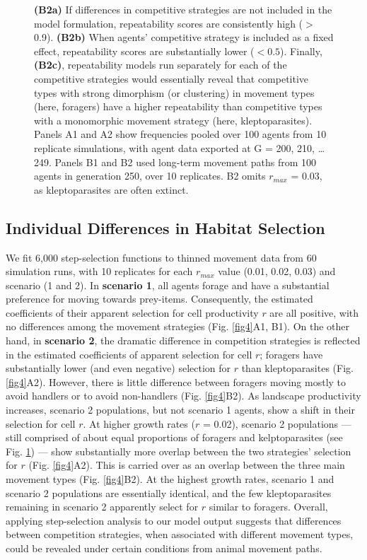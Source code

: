 \begin{figure}[h!]
{            \textbf{(B2a)} If differences in competitive strategies are not included in the model formulation, repeatability scores are consistently high ($>$ 0.9).
            \textbf{(B2b)} When agents' competitive strategy is included as a fixed effect, repeatability scores are substantially lower ($< 0.5$).
            Finally, \textbf{(B2c)}, repeatability models run separately for each of the competitive strategies would essentially reveal that competitive types with strong dimorphism (or clustering) in movement types (here, foragers) have a higher repeatability than competitive types with a monomorphic movement strategy (here, kleptoparasites).
            Panels A1 and A2 show frequencies pooled over 100 agents from 10 replicate simulations, with agent data exported at G = 200, 210, \ldots 249.
            Panels B1 and B2 used long-term movement paths from 100 agents in generation 250, over 10 replicates. B2 omits $r_{max}$ = 0.03, as kleptoparasites are often extinct.
        }
        \label{fig3}
    \end{figure}
    
    \subsection*{Individual Differences in Habitat Selection}
    
    We fit 6,000 step-selection functions to thinned movement data from 60 simulation runs, with 10 replicates for each $r_{max}$ value (0.01, 0.02, 0.03) and scenario (1 and 2).
    In \textbf{scenario 1}, all agents forage and have a substantial preference for moving towards prey-items.
    Consequently, the estimated coefficients of their apparent selection for cell productivity $r$ are all positive, with no differences among the movement strategies (Fig. \ref{fig4}A1, B1).
    On the other hand, in \textbf{scenario 2}, the dramatic difference in competition strategies is reflected in the estimated coefficients of apparent selection for cell $r$; foragers have substantially lower (and even negative) selection for $r$ than kleptoparasites (Fig. \ref{fig4}A2).
    However, there is little difference between foragers moving mostly to avoid handlers or to avoid non-handlers (Fig. \ref{fig4}B2).
    As landscape productivity increases, scenario 2 populations, but not scenario 1 agents, show a shift in their selection for cell $r$.
    At higher growth rates ($r$ = 0.02), scenario 2 populations --- still comprised of about equal proportions of foragers and kelptoparasites (see Fig. \ref{fig3}) --- show substantially more overlap between the two strategies' selection for $r$ (Fig. \ref{fig4}A2).
    This is carried over as an overlap between the three main movement types (Fig. \ref{fig4}B2).
    At the highest growth rates, scenario 1 and scenario 2 populations are essentially identical, and the few kleptoparasites remaining in scenario 2 apparently select for $r$ similar to foragers.
    Overall, applying step-selection analysis to our model output suggests that differences between competition strategies, when associated with different movement types, could be revealed under certain conditions from animal movement paths.
    
